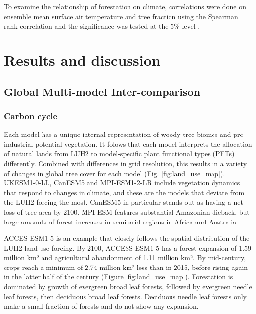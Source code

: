 \documentclass[]{article}
\begin{document}
To examine the relationship of forestation on climate, correlations were done on ensemble mean surface air temperature and tree fraction using the Spearman rank correlation and the significance was tested at the 5\% level \parencite{kokoska2000crc}.

\section{Results and discussion}

\subsection{Global Multi-model Inter-comparison}

\subsubsection{Carbon cycle}

Each model has a unique internal representation of woody tree biomes and pre-industrial potential vegetation.
It folows that each model interprets the allocation of natural lands from LUH2 to model-specific plant functional types (PFTs) differently.
Combined with differences in grid resolution, this results in a variety of changes in global tree cover for each model (Fig. \ref{fig:land_use_map}).
UKESM1-0-LL, CanESM5 and MPI-ESM1-2-LR include vegetation dynamics that respond to changes in climate, and these are the models that deviate from the LUH2 forcing the most.
CanESM5 in particular stands out as having a net loss of tree area by 2100.
MPI-ESM features substantial Amazonian dieback, but large amounts of forest increases in semi-arid regions in Africa and Australia.

ACCES-ESM1-5 is an example that closely follows the spatial distribution of the LUH2 land-use forcing.
By 2100, ACCESS-ESM1-5 has a forest expansion of 1.59 million km² and agricultural abandonment of 1.11 million km².
By mid-century, crops reach a minimum of 2.74 million km² less than in 2015, before rising again in the latter half of the century (Figure \ref{fig:land_use_map}).
Forestation is dominated by growth of evergreen broad leaf forests, followed by evergreen needle leaf forests, then deciduous broad leaf forests.
Deciduous needle leaf forests only make a small fraction of forests and do not show any expansion.
\end{document}
